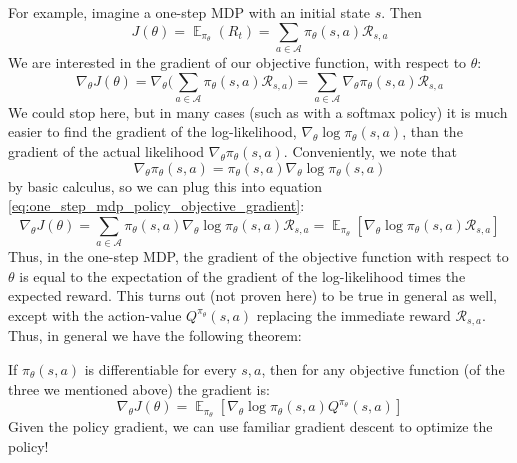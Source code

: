 \documentclass{article}
\DeclareMathOperator{\EX}{\mathbb{E}}
\begin{document}
For example, imagine a one-step MDP with an initial state $s$. Then
\begin{equation}\label{eq:one_step_mdp_policy_objective}
J(\theta) = \EX_{\pi_\theta}(R_t) = \sum_{a\in\mathcal{A}}\pi_\theta(s, a)\mathcal{R}_{s, a}
\end{equation}
We are interested in the gradient of our objective function, with respect to $\theta$:
\begin{equation}\label{eq:one_step_mdp_policy_objective_gradient}
\nabla_\theta J(\theta) = \nabla_\theta\bigg(\sum_{a\in\mathcal{A}}\pi_\theta(s, a)\mathcal{R}_{s, a}\bigg)
=\sum_{a\in\mathcal{A}}\nabla_\theta\pi_\theta(s, a)\mathcal{R}_{s, a}
\end{equation}
We could stop here, but in many cases (such as with a softmax policy) it is much easier to find the gradient of the log-likelihood, $\nabla_\theta \log \pi_\theta(s, a)$, than the gradient of the actual likelihood $\nabla_\theta\pi_\theta(s, a)$. Conveniently, we note that
\begin{equation}\label{eq:one_step_mdp_gradient_of_log_likelihood}
\nabla_\theta\pi_\theta(s, a) = \pi_\theta(s, a)\nabla_\theta \log \pi_\theta(s, a)
\end{equation}
by basic calculus, so we can plug this into equation \eqref{eq:one_step_mdp_policy_objective_gradient}:
\begin{equation}\label{eq:one_step_mdp_policy_objective_gradient_with_log_likelihood}
\nabla_\theta J(\theta) = \sum_{a\in\mathcal{A}}\pi_\theta(s, a)\nabla_\theta \log \pi_\theta(s, a)\mathcal{R}_{s, a}
=\EX_{\pi_\theta}[\nabla_\theta\log \pi_\theta(s, a)\mathcal{R}_{s, a}]
\end{equation}
Thus, in the one-step MDP, the gradient of the objective function with respect to $\theta$ is equal to the expectation of the gradient of the log-likelihood times the expected reward. This turns out (not proven here) to be true in general as well, except with the action-value $Q^{\pi_\theta}(s, a)$ replacing the immediate reward $\mathcal{R}_{s, a}$. Thus, in general we have the following theorem:

If $\pi_\theta(s, a)$ is differentiable for every $s, a$, then for any objective function (of the three we mentioned above) the gradient is:
\begin{equation}\label{eq:general_policy_objective_gradient}
\nabla_\theta J(\theta)=\EX_{\pi_\theta}[\nabla_\theta\log \pi_\theta(s, a)Q^{\pi_\theta}(s, a)]
\end{equation}
Given the policy gradient, we can use familiar gradient descent to optimize the policy!
\end{document}
